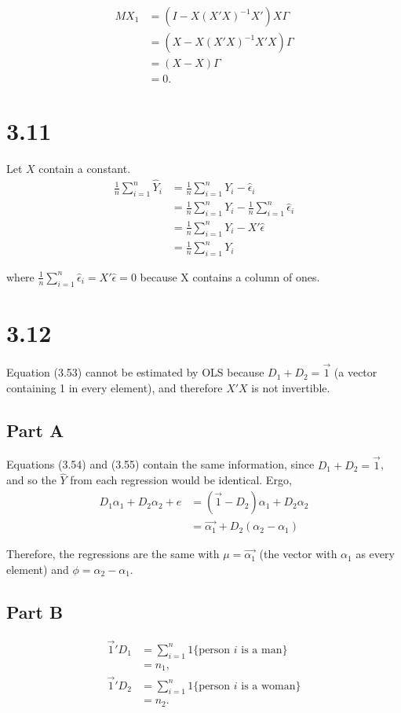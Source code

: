 \documentclass[11pt]{article} %
\begin{document}
\begin{align*}
MX_1 &= (I - X(X'X)^{-1}X')X\Gamma\\
&= (X - X(X'X)^{-1}X'X)\Gamma\\
&= (X-X)\Gamma\\
&= 0.
\end{align*}

\section{3.11}
Let $X$ contain a constant.
\begin{align*}
\frac{1}{n}\sum_{i=1}^n \hat{Y}_i &= \frac{1}{n}\sum_{i=1}^n Y_i - \hat{\epsilon}_i\\
&= \frac{1}{n}\sum_{i=1}^n Y_i  - \frac{1}{n}\sum_{i=1}^n \hat{\epsilon}_i \\
&= \frac{1}{n}\sum_{i=1}^n Y_i - X'\hat{\epsilon}\\
&=  \frac{1}{n}\sum_{i=1}^n Y_i
\end{align*}

where $\frac{1}{n}\sum_{i=1}^n \hat{\epsilon}_i  = X'\hat{\epsilon}  = 0$ because X contains a column of ones.

\section{3.12}
Equation (3.53) cannot be estimated by OLS because $D_1 + D_2 = \vec{1}$ (a vector containing 1 in every element), and therefore $X'X$ is not invertible.
\subsection{Part A}
Equations (3.54) and (3.55) contain the same information, since  $D_1 + D_2 = \vec{1}$, and so the $\hat{Y}$ from each regression would be identical. Ergo,
\begin{align*}
D_1\alpha_1 + D_2 \alpha_2 + e &= (\vec{1} - D_2)\alpha_1 + D_2 \alpha_2\\
&= \vec{\alpha_1 } +D_2(\alpha_2 - \alpha_1)
\end{align*}

Therefore, the regressions are the same with $\mu = \vec{\alpha_1 }$ (the vector with $\alpha_1$ as every element) and $\phi = \alpha_2 - \alpha_1.$
\subsection{Part B}
\begin{align*}
\vec{1}'D_1 &= \sum_{i=1}^n 1\{ \text{person $i$ is a man}\}\\
&=n_1, \\
\vec{1}'D_2 &= \sum_{i=1}^n 1\{ \text{person $i$ is a woman}\}\\
&=n_2.
\end{align*}
\end{document}
